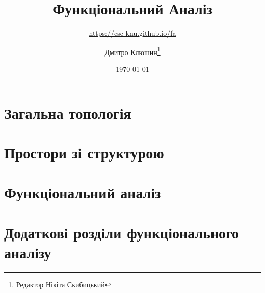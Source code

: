 \documentclass[a4paper,11pt,twoside=semi,openright,numbers=noenddot]{scrbook}
\title{Функціональний Аналіз}
\subtitle{\url{https://csc-knu.github.io/fa}}
\author{Дмитро Клюшин\thanks{Редактор Нікіта Скибицький}}
\date{\today}
\begin{document}
\frontmatter

\maketitle

\thispagestyle{empty}





\tableofcontents

\mainmatter

\part{Загальна топологія}
\parttoc






\part{Простори зі структурою}
\parttoc






\part{Функціональний аналіз}
\parttoc








\part{Додаткові розділи функціонального аналізу}
\parttoc


\end{document}
